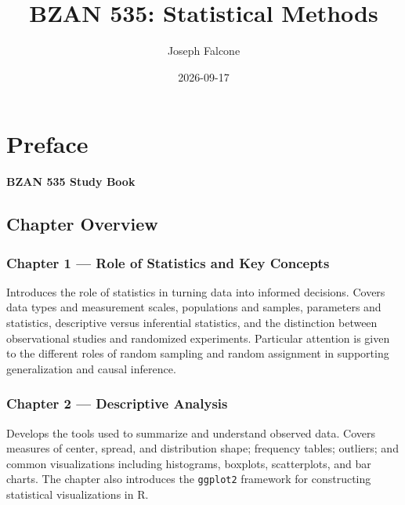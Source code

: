 \documentclass[
  letterpaper,
  DIV=11,
  numbers=noendperiod]{scrreprt}
\title{BZAN 535: Statistical Methods}
\author{Joseph Falcone}
\date{2026-09-17}
\renewcommand*\contentsname{Table of contents}
\newcommand\contentsname{Table of contents}
\begin{document}
\maketitle

\renewcommand*\contentsname{Table of contents}
{
\setcounter{tocdepth}{2}
\tableofcontents
}


\chapter*{Preface}\label{preface}


\textbf{BZAN 535 Study Book}

\section*{Chapter Overview}\label{chapter-overview}


\subsection*{Chapter 1 --- Role of Statistics and Key
Concepts}\label{chapter-1-role-of-statistics-and-key-concepts}

Introduces the role of statistics in turning data into informed
decisions. Covers data types and measurement scales, populations and
samples, parameters and statistics, descriptive versus inferential
statistics, and the distinction between observational studies and
randomized experiments. Particular attention is given to the different
roles of random sampling and random assignment in supporting
generalization and causal inference.

\subsection*{Chapter 2 --- Descriptive
Analysis}\label{chapter-2-descriptive-analysis}

Develops the tools used to summarize and understand observed data.
Covers measures of center, spread, and distribution shape; frequency
tables; outliers; and common visualizations including histograms,
boxplots, scatterplots, and bar charts. The chapter also introduces the
\texttt{ggplot2} framework for constructing statistical visualizations
in R.
\end{document}
